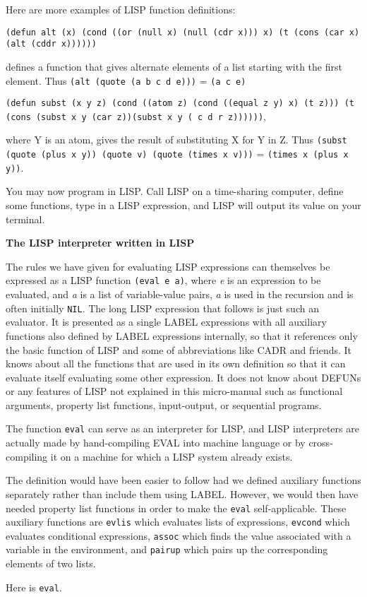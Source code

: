 \documentclass[8pt,letter,twocolumn]{article}
\begin{document}
Here are more examples of LISP function definitions:

\texttt{(defun alt (x) (cond ((or (null x) (null (cdr x))) x) (t (cons (car x)
  (alt (cddr x))))))}

defines a function that gives alternate elements of a list starting with the
first element. Thus \texttt{(alt (quote (a b c d e)))} = \texttt{(a c e)}

\texttt{(defun subst (x y z) (cond ((atom z) (cond ((equal z y) x) (t z))) (t
  (cons (subst x y (car z))(subst x y ( c d r z))))))},

where Y is an atom, gives the result of substituting X for Y in Z. Thus
\texttt{(subst (quote (plus x y)) (quote v) (quote (times x v)))} =
\texttt{(times x (plus x y))}.

You may now program in LISP. Call LISP on a time-sharing computer, define some
functions, type in a LISP expression, and LISP will output its value on your
terminal.

\vspace*{1\baselineskip}
\textbf{The LISP interpreter written in LISP}
\vspace*{1\baselineskip}

The rules we have given for evaluating LISP expressions can themselves be
expressed as a LISP function \texttt{(eval e a)}, where \textit{e} is an
expression to be evaluated, and \textit{a} is a list of variable-value pairs,
\textit{a} is used in the recursion and is often initially \texttt{NIL}. The
long LISP expression that follows is just such an evaluator. It is presented as
a single LABEL expressions with all auxiliary functions also defined by LABEL
expressions internally, so that it references only the basic function of LISP
and some of abbreviations like CADR and friends. It knows about all the
functions that are used in its own definition so that it can evaluate itself
evaluating some other expression. It does not know about DEFUNs or any features
of LISP not explained in this micro-manual such as functional arguments,
property list functions, input-output, or sequential programs.

The function \texttt{eval} can serve as an interpreter for LISP, and LISP
interpreters are actually made by hand-compiling EVAL into machine language or
by cross-compiling it on a machine for which a LISP system already exists.

The definition would have been easier to follow had we defined auxiliary
functions separately rather than include them using LABEL. However, we would
then have needed property list functions in order to make the \texttt{eval}
self-applicable. These auxiliary functions are \texttt{evlis} which evaluates
lists of expressions, \texttt{evcond} which evaluates conditional expressions,
\texttt{assoc} which finds the value associated with a variable in the
environment, and \texttt{pairup} which pairs up the corresponding elements of
two lists.

\newpage
Here is \texttt{eval}.

\end{document}
